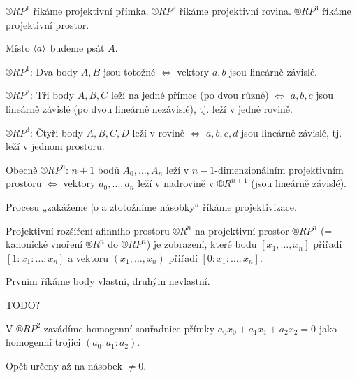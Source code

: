 \documentclass[12pt]{article}					%
\begin{document}
\begin{definice}
	$®RP^1$ říkáme projektivní přímka.
	$®RP^2$ říkáme projektivní rovina.
	$®RP^3$ říkáme projektivní prostor.
\end{definice}

\begin{poznamka}[Značení]
	Místo $\left\langle a\right\rangle$ budeme psát $A$.
\end{poznamka}

\begin{poznamka}
	$®RP^1$: Dva body $A, B$ jsou totožné $\Leftrightarrow$ vektory $a, b$ jsou lineárně závislé.

	$®RP^2$: Tři body $A, B, C$ leží na jedné přímce (po dvou různé) $\Leftrightarrow$ $a, b, c$ jsou lineárně závislé (po dvou lineárně nezávislé), tj. leží v jedné rovině.

	$®RP^3$: Čtyři body $A, B, C, D$ leží v rovině $\Leftrightarrow$ $a, b, c, d$ jsou lineárně závislé, tj. leží v jednom prostoru.

	Obecně $®RP^n$: $n+1$ bodů $A_0, …, A_n$ leží v $n-1$-dimenzionálním projektivním prostoru $\Leftrightarrow$ vektory $a_0, …, a_n$ leží v nadrovině v $®R^{n+1}$ (jsou lineárně závislé).
\end{poznamka}

\begin{poznamka}
	Procesu „zakážeme ¦o a ztotožníme násobky“ říkáme projektivizace.
\end{poznamka}

\begin{definice}
	Projektivní rozšíření afinního prostoru $®R^n$ na projektivní prostor $®RP^n$ (= kanonické vnoření $®R^n$ do $®RP^n$) je zobrazení, které bodu $[x_1, …, x_n]$ přiřadí $[1:x_1:…:x_n]$ a vektoru $(x_1, …, x_n)$ přiřadí $[0:x_1:…:x_n]$.

	Prvním říkáme body vlastní, druhým nevlastní.
\end{definice}

TODO?

\begin{definice}
	V $®RP^2$ zavádíme homogenní souřadnice přímky $a_0 x_0 + a_1 x_1 + a_2 x_2 = 0$ jako homogenní trojici $(a_0:a_1:a_2)$.

	\begin{poznamkain}
		Opět určeny až na násobek $≠ 0$.
	\end{poznamkain}
\end{definice}
\end{document}
